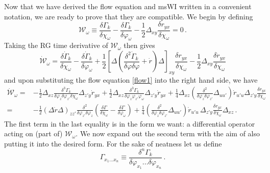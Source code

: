 \documentclass[11pt,a4paper]{article}
\numberwithin{figure}{section}
\numberwithin{equation}{section}
\begin{document}
Now that we have derived the flow equation and msWI written in a convenient notation, we are ready to prove that they are compatible. We begin by defining
\begin{equation}
\label{cal-W}
	\mathcal{W}_\omega\equiv\frac{\delta \Gamma_k}{\delta\chi_\omega}-\frac{\delta \Gamma_k}{\delta\varphi_\omega}
	-\frac{1}{2}\Delta_{xy}\frac{\delta r_{yx}}{\delta\chi_\omega} =0 \,.
\end{equation}
Taking the RG time derivative of $\mathcal{W_\omega}$ then gives
\begin{equation}
	\label{WIdot}
	\mathcal{\dot W}_\omega= \frac{\delta \dot\Gamma_k}{\delta\chi_\omega}
	-\frac{\delta \dot\Gamma_k}{\delta\varphi_\omega}+
	\frac{1}{2}\left[\Delta\left(\frac{\delta^{2}\dot{\Gamma}_k}{\delta\varphi \delta\varphi}
	+\dot r\right)\Delta\right]_{\!xy}\frac{\delta r_{yx}}{\delta\chi_\omega}
	-\frac{1}{2}\Delta_{xy}\frac{\delta \dot r_{yx}}{\delta\chi_\omega}
\end{equation}
and upon substituting the flow equation \eqref{flow1} into the right hand side, we have
\begin{align}\label{WIdot-2}
	\mathcal{\dot W}_{\omega}=&-\frac{1}{2}\Delta_{xz}
	\frac{\delta^{3}\Gamma_k}{\delta\varphi_{z}\delta\varphi_{z'}\delta\chi_{\omega}}\Delta_{z'y}\dot r_{yx}
	 + \frac{1}{2}\Delta_{xz}\frac{\delta^{3}\Gamma_k}{\delta\varphi_{z}
	 \varphi_{z'}\varphi_\omega}\Delta_{z'y}\dot{r}_{yx}
	 +\frac{1}{4}\Delta_{xz}\left(\frac{\delta^{2}}{\delta\varphi_{z}\delta\varphi_{z'}}\Delta_{uu'}\right)
	 \dot r_{u'u}\Delta_{z'y}\frac{\delta r_{yx}}{\delta\chi_{\omega}}\nonumber\\
	=&-\frac{1}{2}(\Delta \dot{r} \Delta)_{zz'}\frac{\delta^{2}}{\delta\varphi_{z'}\delta\varphi_{z}}
	 \left(\frac{\delta\Gamma}{\delta\chi_\omega}-\frac{\delta\Gamma}{\delta\varphi_\omega}\right)
	  +\frac{1}{4}\left(\frac{\delta^{2}}{\delta\varphi_{z}\delta\varphi_{z'}}\Delta_{uu'}\right)
	 \dot r_{u'u}\,\Delta_{z'y}\frac{\delta r_{yx}}{\delta\chi_{\omega}}\Delta_{xz} \,.
\end{align}
The first term in the last equality is in the form we want: a differential operator acting on (part of) $\mathcal{W_\omega}$. We now expand out the second term with the aim of also putting it into the desired form. For the sake of neatness let us define
\begin{equation}
		\Gamma_{x_1...x_n}\equiv \frac{\delta^n\Gamma_k}{\delta\varphi_{x_1}...\delta\varphi_{x_n}} \,.
\end{equation}
\end{document}
